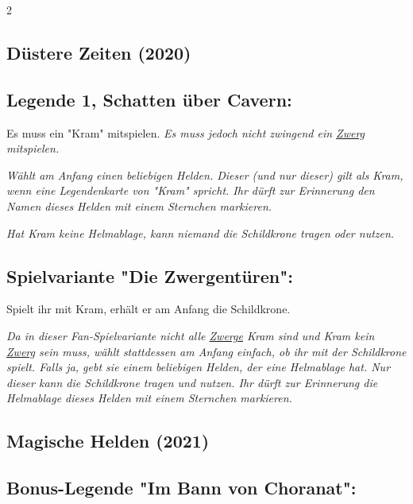 \documentclass[10pt, a4paper, oneside]{book}
\newcommand{\fan}[1]{\textit{#1}}
\begin{document}
\begin{multicols*}{2}
\columnbreak


\begin{bgcolor}[color-dz]
\section{Düstere Zeiten (2020)}


\subsection{Legende 1, Schatten über Cavern:}

Es muss ein "Kram" mitspielen.
\supercite{dz-begleitheft} 
\fan{Es muss jedoch nicht zwingend ein \hyperref[zwerg]{Zwerg} mitspielen.} 

\fan{Wählt am Anfang einen beliebigen Helden. Dieser (und nur dieser) gilt als Kram, wenn eine Legendenkarte von "Kram" spricht. Ihr dürft zur Erinnerung den Namen dieses Helden mit einem Sternchen markieren.}

\fan{Hat Kram keine Helmablage, kann niemand die Schildkrone tragen oder nutzen.}

\subsection{Spielvariante "Die Zwergentüren":}

Spielt ihr mit Kram, erhält er am Anfang die Schildkrone.
\supercite{dz-begleitheft}

\fan{Da in dieser Fan-Spielvariante nicht alle \hyperref[zwerg]{Zwerge} Kram sind und Kram kein \hyperref[zwerg]{Zwerg} sein muss, wählt stattdessen am Anfang einfach, ob ihr mit der Schildkrone spielt. Falls ja, gebt sie einem beliebigen Helden, der eine Helmablage hat. Nur dieser kann die Schildkrone tragen und nutzen. Ihr dürft zur Erinnerung die Helmablage dieses Helden mit einem Sternchen markieren.}

\end{bgcolor}


\begin{nobgcolor}
\section{Magische Helden (2021)}

\subsection{Bonus-Legende "Im Bann von Choranat":}


\end{nobgcolor}
\end{multicols*}
\end{document}
